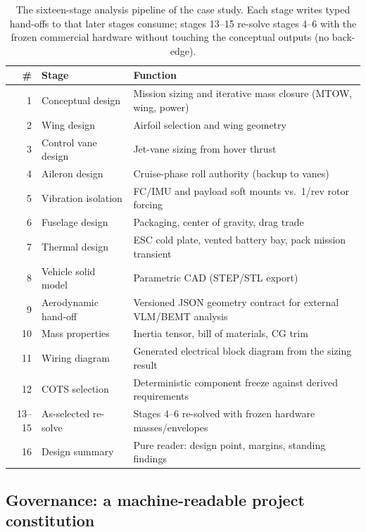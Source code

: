 \begin{table}[htbp]
\centering
\caption{The sixteen-stage analysis pipeline of the case study. Each
stage writes typed hand-offs to  that later stages consume;
stages 13--15 re-solve stages 4--6 with the frozen commercial hardware
without touching the conceptual outputs (no back-edge).}
\label{tab:pipeline}
\small
\begin{tabularx}{\textwidth}{@{}rlX@{}}
\toprule
\# & \textbf{Stage} & \textbf{Function} \\
\midrule
1 & Conceptual design & Mission sizing and iterative mass closure (MTOW, wing, power) \\
2 & Wing design & Airfoil selection and wing geometry \\
3 & Control vane design & Jet-vane sizing from hover thrust \\
4 & Aileron design & Cruise-phase roll authority (backup to vanes) \\
5 & Vibration isolation & FC/IMU and payload soft mounts vs.\ 1/rev rotor forcing \\
6 & Fuselage design & Packaging, center of gravity, drag trade \\
7 & Thermal design & ESC cold plate, vented battery bay, pack mission transient \\
8 & Vehicle solid model & Parametric CAD (STEP/STL export) \\
9 & Aerodynamic hand-off & Versioned JSON geometry contract for external VLM/BEMT analysis \\
10 & Mass properties & Inertia tensor, bill of materials, CG trim \\
11 & Wiring diagram & Generated electrical block diagram from the sizing result \\
12 & COTS selection & Deterministic component freeze against derived requirements \\
13--15 & As-selected re-solve & Stages 4--6 re-solved with frozen hardware masses/envelopes \\
16 & Design summary & Pure reader: design point, margins, standing findings \\
\bottomrule
\end{tabularx}
\end{table}

\subsection{Governance: a machine-readable project constitution}
\label{sec:governance}

